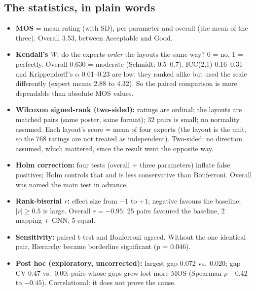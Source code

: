 \documentclass[10pt,a4paper]{article}
\begin{document}
\subsection*{The statistics, in plain words}
\begin{itemize}
\item \textbf{MOS} = mean rating (with SD), per parameter and overall (the mean of the three). Overall 3.53, between Acceptable and Good.
\item \textbf{Kendall's $W$}: do the experts \emph{order} the layouts the same way? 0 = no, 1 = perfectly. Overall 0.630 = moderate (Schmidt: 0.5--0.7). ICC(2,1) 0.16--0.31 and Krippendorff's $\alpha$ 0.01--0.23 are low: they ranked alike but used the scale differently (expert means 2.88 to 4.32). So the paired comparison is more dependable than absolute MOS values.
\item \textbf{Wilcoxon signed-rank (two-sided):} ratings are ordinal; the layouts are matched pairs (same poster, same format); 32 pairs is small; no normality assumed. Each layout's score = mean of four experts (the layout is the unit, so the 768 ratings are not treated as independent). Two-sided: no direction assumed, which mattered, since the result went the opposite way.
\item \textbf{Holm correction:} four tests (overall + three parameters) inflate false positives; Holm controls that and is less conservative than Bonferroni. Overall was named the main test in advance.
\item \textbf{Rank-biserial $r$:} effect size from $-1$ to $+1$; negative favours the baseline; $|r| \ge 0.5$ is large. Overall $r = -0.95$: 25 pairs favoured the baseline, 2 mapping + GNN, 5 equal.
\item \textbf{Sensitivity:} paired t-test and Bonferroni agreed. Without the one identical pair, Hierarchy became borderline significant (p = 0.046).
\item \textbf{Post hoc (exploratory, uncorrected):} largest gap 0.072 vs.\ 0.020; gap CV 0.47 vs.\ 0.00; pairs whose gaps grew lost more MOS (Spearman $\rho$ $-0.42$ to $-0.45$). Correlational: it does not prove the cause.
\end{itemize}
\end{document}
